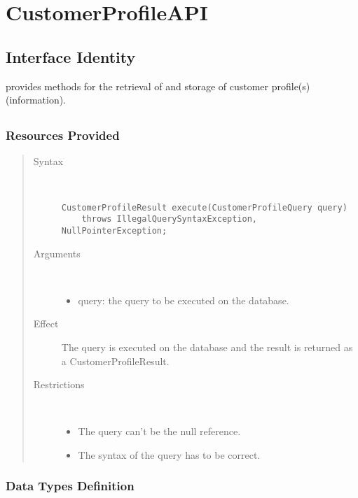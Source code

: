 \section{CustomerProfileAPI}
\label{api:customer-profile-api}

\subsection{Interface Identity}

\npar {} provides methods for the retrieval of and storage of
customer profile(s) (information).

\subsection{}

\subsubsection{Resources Provided}

\begin{quote}
	\begin{description}
		\item[Syntax] \
		\begin{verbatim}
CustomerProfileResult execute(CustomerProfileQuery query)
    throws IllegalQuerySyntaxException, NullPointerException;
		\end{verbatim}
		\item[Arguments] \
		\begin{itemize}
		  \item query: the query to be executed on the database. 
		\end{itemize}
		\item[Effect] The query is executed on the database and the result is returned
		as a CustomerProfileResult. 
		\item[Restrictions] \
		\begin{itemize}
		  \item The query can't be the null reference.
		  \item The syntax of the query has to be correct.
		\end{itemize}
	\end{description} 
\end{quote}

\subsubsection{Data Types Definition}

